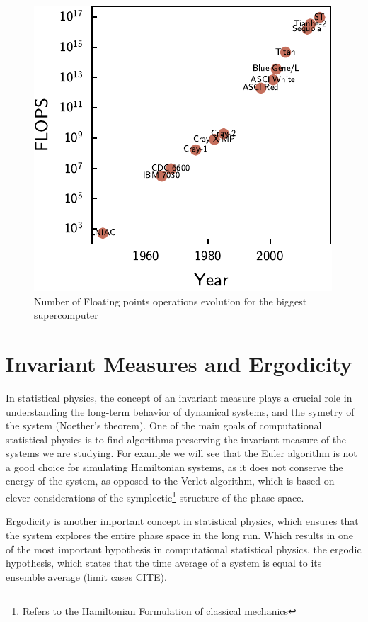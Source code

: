 \documentclass[ansiapaper]{report}
\begin{document}
\begin{multicols}{3}
  \begin{figure}[H]
    \centering
    \includegraphics[width=1\linewidth]{./figures/supercomputer_flops.pdf}
    \caption{Number of Floating points operations evolution for the biggest supercomputer \label{fig:supercomputer_flops}}
  \end{figure}

  \section{Invariant Measures and Ergodicity}

  In statistical physics, the concept of an invariant measure plays a crucial role in understanding the long-term behavior of dynamical systems, and the symetry of the system (Noether's theorem). One of the main goals of computational statistical physics is to find algorithms preserving the invariant measure of the systems we are studying. For example we will see that the Euler algorithm is not a good choice for simulating Hamiltonian systems, as it does not conserve the energy of the system, as opposed to the Verlet algorithm, which is based on clever considerations of the symplectic\footnote{Refers to the Hamiltonian Formulation of classical mechanics} structure of the phase space.

  Ergodicity is another important concept in statistical physics, which ensures that the system explores the entire phase space in the long run. Which results in one of the most important hypothesis in computational statistical physics, the ergodic hypothesis, which states that the time average of a system is equal to its ensemble average (limit cases CITE).


\end{multicols}
\end{document}
